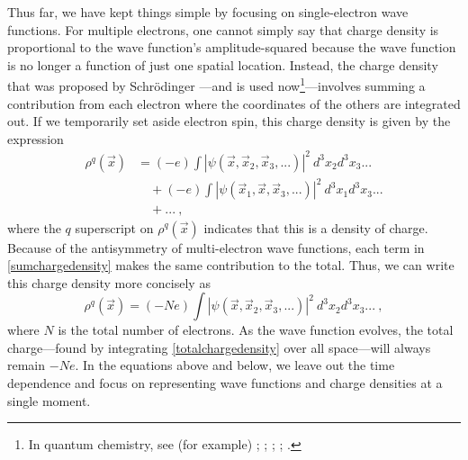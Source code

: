\documentclass[onecolumn,secnumarabic,amsmath,amssymb,balancelastpage,nofootinbib]{article}
\begin{document}
Thus far, we have kept things simple by focusing on single-electron wave functions.  For multiple electrons, one cannot simply say that charge density is proportional to the wave function's amplitude-squared because the wave function is no longer a function of just one spatial location.  Instead, the charge density that was proposed by Schr\"{o}dinger \cite{schrodinger1926pt4, schrodingerletter}---and is used now\footnote{In quantum chemistry, see (for example) \cite[sec.\ 3.8.3]{szaboQC}; \cite[sec.\ 1.3]{bader1990}; \cite{bader2010}; \cite{matta2002}; \cite[pg.\ 403]{levineQC}.}---involves summing a contribution from each electron where the coordinates of the others are integrated out.  If we temporarily set aside electron spin, this charge density is given by the expression
\begin{align}
\rho^q(\vec{x})&=(-e) \int{|\psi(\vec{x},\vec{x}_2, \vec{x}_3, ...)|^2 \ d^3 x_2 d^3 x_3 ...}
\nonumber
\\
&\quad + (-e) \int{|\psi(\vec{x}_1,\vec{x}, \vec{x}_3, ...)|^2 \ d^3 x_1 d^3 x_3 ...}
\nonumber
\\
&\quad + ...
\ ,
\label{sumchargedensity}
\end{align}
where the $q$ superscript on $\rho^q(\vec{x})$ indicates that this is a density of charge.  Because of the antisymmetry of multi-electron wave functions, each term in \eqref{sumchargedensity} makes the same contribution to the total.  Thus, we can write this charge density more concisely as
\begin{equation}
\rho^q(\vec{x})=(-N e) \int{|\psi(\vec{x},\vec{x}_2, \vec{x}_3, ...)|^2 \ d^3 x_2 d^3 x_3 ...}
\ ,
\label{totalchargedensity}
\end{equation}
where $N$ is the total number of electrons.  As the wave function evolves, the total charge---found by integrating \eqref{totalchargedensity} over all space---will always remain $-Ne$.  In the equations above and below, we leave out the time dependence and focus on representing wave functions and charge densities at a single moment.
\end{document}
